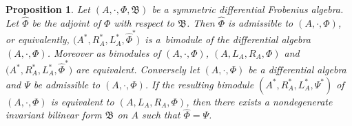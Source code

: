 \documentclass[pdftex]{sigma}
\numberwithin{equation}{section}
\newtheorem{Proposition}[Theorem]{Proposition}
{ \theoremstyle{definition}
	\newtheorem{Definition}[Theorem]{Definition}
	\newtheorem{Note}[Theorem]{Note}
	\newtheorem{Example}[Theorem]{Example}
	\newtheorem{Remark}[Theorem]{Remark} }
\begin{document}
\begin{Proposition}\label{pro:FroRep}
 Let $(A, \cdot, \Phi, \mathfrak{B})$ be a symmetric differential Frobenius algebra.
 Let $\hat{\Phi}$ be the adjoint of $\Phi$ with respect to $\mathfrak{B}$.
 Then $\hat{\Phi}$ is admissible to $(A, \cdot, \Phi)$, or equivalently,
 $\big(A^*, R_A^*, L_A^*, \hat{\Phi}^*\big)$~is a~bimodule of the differential algebra $(A, \cdot, \Phi)$.
 Moreover as bimodules of $(A, \cdot, \Phi)$, $(A, L_A, R_A, \Phi)$ and $\big(A^*, R_A^*, L_A^*, \hat{\Phi}^*\big)$ are equivalent.
 Conversely let $(A, \cdot, \Phi)$ be a differential algebra and $\Psi$ be admissible to $(A, \cdot, \Phi)$.
 If the resulting bimodule $(A^*, R_A^*, L_A^*, \Psi^*)$ of $(A, \cdot, \Phi)$ is equivalent to $(A, L_A, R_A, \Phi)$,
 then there exists a nondegenerate invariant bilinear form $\mathfrak{B}$ on $A$ such that $\hat{\Phi} = \Psi$.
\end{Proposition}
\end{document}
